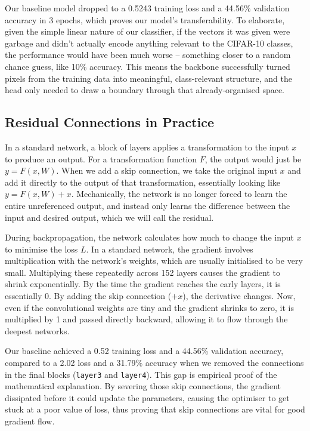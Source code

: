 \documentclass{article}
\begin{document}
    Our baseline model dropped to a 0.5243 training loss and a 44.56\% validation accuracy in 3 epochs, which proves our model's transferability. To elaborate, given the simple linear nature of our classifier, if the vectors it was given were garbage and didn't actually encode anything relevant to the CIFAR-10 classes, the performance would have been much worse -- something closer to a random chance guess, like 10\% accuracy. This means the backbone successfully turned pixels from the training data into meaningful, class-relevant structure, and the head only needed to draw a boundary through that already-organised space.
    
    \subsection{Residual Connections in Practice}
    In a standard network, a block of layers applies a transformation to the input $x$ to produce an output. For a transformation function $F$, the output would just be $y = F(x, W)$. When we add a skip connection, we take the original input $x$ and add it directly to the output of that transformation, essentially looking like $y = F(x, W) + x$. Mechanically, the network is no longer forced to learn the entire unreferenced output, and instead only learns the difference between the input and desired output, which we will call the residual.
    
    During backpropagation, the network calculates how much to change the input $x$ to minimise the loss $L$. In a standard network, the gradient involves multiplication with the network's weights, which are usually initialised to be very small. Multiplying these repeatedly across 152 layers causes the gradient to shrink exponentially. By the time the gradient reaches the early layers, it is essentially 0. By adding the skip connection ($+x$), the derivative changes. Now, even if the convolutional weights are tiny and the gradient shrinks to zero, it is multiplied by 1 and passed directly backward, allowing it to flow through the deepest networks.
    
    Our baseline achieved a 0.52 training loss and a 44.56\% validation accuracy, compared to a 2.02 loss and a 31.79\% accuracy when we removed the connections in the final blocks (\texttt{layer3} and \texttt{layer4}). This gap is empirical proof of the mathematical explanation. By severing those skip connections, the gradient dissipated before it could update the parameters, causing the optimiser to get stuck at a poor value of loss, thus proving that skip connections are vital for good gradient flow.
    
\end{document}
